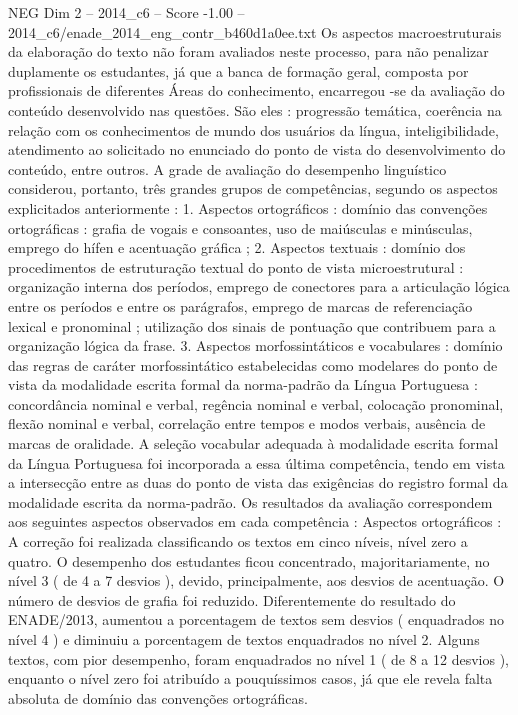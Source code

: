\begin{textsample}{NEG Dim 2 – 2014\_c6 – Score -1.00 – 2014\_c6/enade\_2014\_eng\_contr\_b460d1a0ee.txt}
Os aspectos macroestruturais da elaboração do texto não foram avaliados neste processo, para não penalizar duplamente os estudantes, já que a banca de formação geral, composta por profissionais de diferentes Áreas do conhecimento, encarregou -se da avaliação do conteúdo desenvolvido nas questões.
São eles : progressão temática, coerência na relação com os conhecimentos de mundo dos usuários da língua, inteligibilidade, atendimento ao solicitado no enunciado do ponto de vista do desenvolvimento do conteúdo, entre outros.
A grade de avaliação do desempenho linguístico considerou, portanto, três grandes grupos de competências, segundo os aspectos explicitados anteriormente : 1.
Aspectos ortográficos : domínio das convenções ortográficas : grafia de vogais e consoantes, uso de maiúsculas e minúsculas, emprego do hífen e acentuação gráfica ; 2.
Aspectos textuais : domínio dos procedimentos de estruturação textual do ponto de vista microestrutural : organização interna dos períodos, emprego de conectores para a articulação lógica entre os períodos e entre os parágrafos, emprego de marcas de referenciação lexical e pronominal ; utilização dos sinais de pontuação que contribuem para a organização lógica da frase. 3.
Aspectos morfossintáticos e vocabulares : domínio das regras de caráter morfossintático estabelecidas como modelares do ponto de vista da modalidade escrita formal da norma-padrão da Língua Portuguesa : concordância nominal e verbal, regência nominal e verbal, colocação pronominal, flexão nominal e verbal, correlação entre tempos e modos verbais, ausência de marcas de oralidade.
A seleção vocabular adequada à modalidade escrita formal da Língua Portuguesa foi incorporada a essa última competência, tendo em vista a intersecção entre as duas do ponto de vista das exigências do registro formal da modalidade escrita da norma-padrão.
Os resultados da avaliação correspondem aos seguintes aspectos observados em cada competência : Aspectos ortográficos : A correção foi realizada classificando os textos em cinco níveis, nível zero a quatro.
O desempenho dos estudantes ficou concentrado, majoritariamente, no nível 3 ( de 4 a 7 desvios ), devido, principalmente, aos desvios de acentuação.
O número de desvios de grafia foi reduzido.
Diferentemente do resultado do ENADE/2013, aumentou a porcentagem de textos sem desvios ( enquadrados no nível 4 ) e diminuiu a porcentagem de textos enquadrados no nível 2.
Alguns textos, com pior desempenho, foram enquadrados no nível 1 ( de 8 a 12 desvios ), enquanto o nível zero foi atribuído a pouquíssimos casos, já que ele revela falta absoluta de domínio das convenções ortográficas.

\end{textsample}
